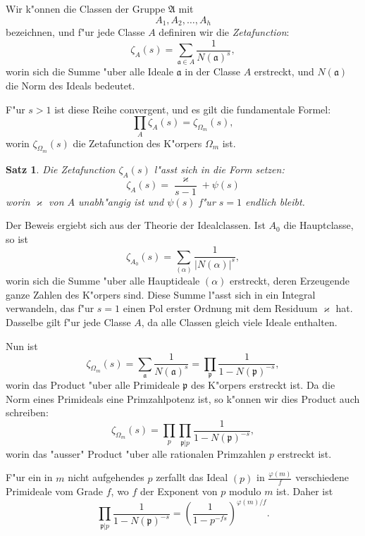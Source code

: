 \documentclass[10pt,a4paper]{article}
\theoremstyle{weberstyle}
\newtheorem{satz}{Satz}[section]
\begin{document}
Wir k"onnen die Classen der Gruppe $\mathfrak{A}$ mit
\[
A_1,A_2,\dots,A_h
\]
bezeichnen, und f"ur jede Classe $A$ definiren wir die \emph{Zetafunction}:
\begin{equation}\label{eq:nachtrag2.1}
\zeta_A(s) = \sum_{\mathfrak{a}\in A}\frac{1}{N(\mathfrak{a})^s},
\end{equation}
worin sich die Summe "uber alle Ideale $\mathfrak{a}$ in der Classe $A$
erstreckt, und $N(\mathfrak{a})$ die Norm des Ideals bedeutet.

F"ur $s>1$ ist diese Reihe convergent, und es gilt die fundamentale
Formel:
\begin{equation}\label{eq:nachtrag2.2}
\prod_A\zeta_A(s) = \zeta_{\Omega_m}(s),
\end{equation}
worin $\zeta_{\Omega_m}(s)$ die Zetafunction des K"orpers $\Omega_m$ ist.

\begin{satz}
Die Zetafunction $\zeta_A(s)$ l"asst sich in die Form setzen:
\begin{equation}\label{eq:nachtrag2.3}
\zeta_A(s) = \frac{\varkappa}{s-1} + \psi(s)
\end{equation}
worin $\varkappa$ von $A$ unabh"angig ist und $\psi(s)$ f"ur $s=1$ endlich
bleibt.
\end{satz}

Der Beweis ergiebt sich aus der Theorie der Idealclassen. Ist $A_0$ die
Hauptclasse, so ist
\[
\zeta_{A_0}(s) = \sum_{(\alpha)}\frac{1}{|N(\alpha)|^s},
\]
worin sich die Summe "uber alle Hauptideale $(\alpha)$ erstreckt, deren
Erzeugende ganze Zahlen des K"orpers sind. Diese Summe l"asst sich in
ein Integral verwandeln, das f"ur $s=1$ einen Pol erster Ordnung mit dem
Residuum $\varkappa$ hat. Dasselbe gilt f"ur jede Classe $A$, da alle
Classen gleich viele Ideale enthalten.

Nun ist
\[
\zeta_{\Omega_m}(s) = \sum_{\mathfrak{a}}\frac{1}{N(\mathfrak{a})^s}
= \prod_{\mathfrak{p}}\frac{1}{1-N(\mathfrak{p})^{-s}},
\]
worin das Product "uber alle Primideale $\mathfrak{p}$ des K"orpers erstreckt
ist. Da die Norm eines Primideals eine Primzahlpotenz ist, so k"onnen
wir dies Product auch schreiben:
\[
\zeta_{\Omega_m}(s) = \prod_p\prod_{\mathfrak{p}|p}
\frac{1}{1-N(\mathfrak{p})^{-s}},
\]
worin das "ausser" Product "uber alle rationalen Primzahlen $p$ erstreckt
ist.

F"ur ein in $m$ nicht aufgehendes $p$ zerfallt das Ideal $(p)$ in
$\frac{\varphi(m)}{f}$ verschiedene Primideale vom Grade $f$, wo $f$ der
Exponent von $p$ modulo $m$ ist. Daher ist
\[
\prod_{\mathfrak{p}|p}\frac{1}{1-N(\mathfrak{p})^{-s}} =
\left(\frac{1}{1-p^{-fs}}\right)^{\varphi(m)/f}.
\]
\end{document}
